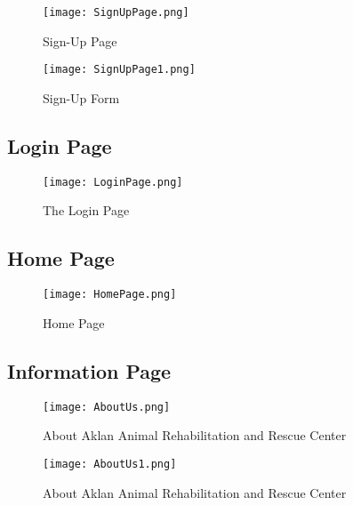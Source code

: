 \begin{figure}[h]              
	\centering                    
	\texttt{[image: SignUpPage.png]}  
	\caption{Sign-Up Page}
	\label{fig:disneystock}
		
\end{figure}

\begin{figure}[h]              
	\centering                    
	\texttt{[image: SignUpPage1.png]}  
	\caption{Sign-Up Form}
	\label{fig:disneystock}
	
\end{figure}

\newpage
\subsection{Login Page}

\begin{figure}[h]                
	\centering                  
	\texttt{[image: LoginPage.png]}    
	\caption{The Login Page}
	\label{fig:disneystock}
\end{figure}

\subsection{Home Page}

\begin{figure}[h]
	\centering                    
	\texttt{[image: HomePage.png]}       
	\caption{Home Page}
	\label{fig:disneystock}
\end{figure}

\newpage
\subsection{Information Page}

\begin{figure}[h]                
	\centering                   
	\texttt{[image: AboutUs.png]}      
	\caption{About Aklan Animal Rehabilitation and Rescue Center}
	\label{fig:disneystock}
\end{figure}

\begin{figure}[h]                
	\centering                   
	\texttt{[image: AboutUs1.png]}      
	\caption{About Aklan Animal Rehabilitation and Rescue Center}
	\label{fig:disneystock}
\end{figure}


